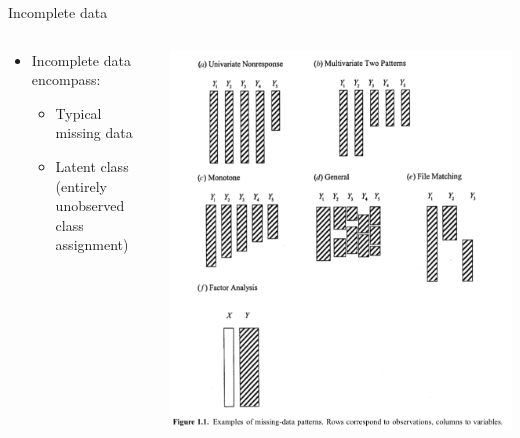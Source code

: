 \documentclass[dvipdfmx,bigger,aspectratio=169]{beamer}
\begin{document}
\begin{frame}[label={sec:org288e94e}]{Incomplete data}
\begin{columns}
\begin{column}{0.45\columnwidth}
\begin{itemize}
\item Incomplete data encompass:
\begin{itemize}
\item Typical missing data
\item Latent class (entirely unobserved class assignment)
\end{itemize}
\end{itemize}
\end{column}

\begin{column}{0.45\columnwidth}
\begin{center}
\includegraphics[page=1,keepaspectratio,width=\textwidth,height=0.75\textheight]{./source/missing_patterns.png}
\end{center}
\scriptsize \cite{littleStatisticalAnalysisMissing2002} \normalsize
\end{column}
\end{columns}
\end{frame}
\end{document}
